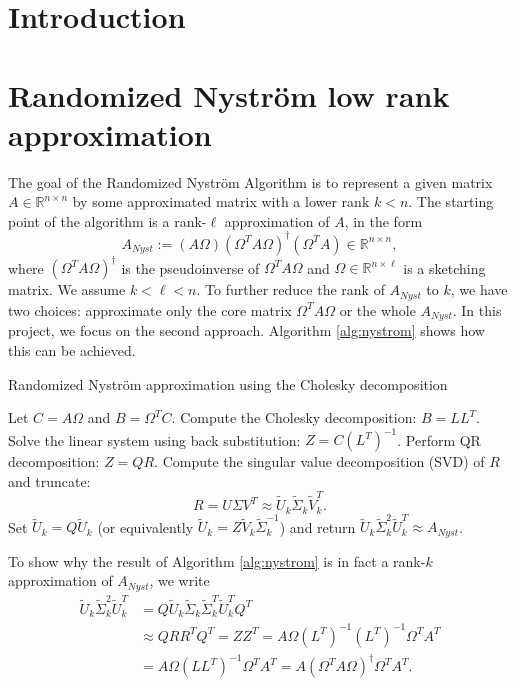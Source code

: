 \documentclass[a4paper, 12pt,oneside]{article}
\begin{document}
 
	 
	\clearpage
	\tableofcontents
	\thispagestyle{empty}
	\clearpage
	\setcounter{page}{1}

	\section{Introduction}
		\lipsum[1]
	\section{Randomized Nyström low rank approximation}
		The goal of the Randomized Nystr\"om Algorithm is to represent a given matrix $A \in \mathbb{R}^{n \times n}$ by some approximated matrix with a lower rank $k < n$. The starting point of the algorithm is a rank-$\ell$ approximation of $A$, in the form
\[
A_{Nyst} := (A\Omega)(\Omega^T A \Omega)^{\dagger}(\Omega^T A) \in \mathbb{R}^{n \times n},
\]
where $(\Omega^T A \Omega)^\dagger$ is the pseudoinverse of $\Omega^T A \Omega$ and $\Omega \in \mathbb{R}^{n \times \ell}$ is a sketching matrix. We assume $k < \ell < n$. To further reduce the rank of $A_{Nyst}$ to $k$, we have two choices: approximate only the core matrix $\Omega^T A \Omega$ or the whole $A_{Nyst}$. In this project, we focus on the second approach. Algorithm \ref{alg:nystrom} shows how this can be achieved.

\begin{algorithm}
\caption{Randomized Nystr\"om approximation using the Cholesky decomposition}
\label{alg:nystrom}
\begin{algorithmic}[1]
  \State Let $C = A\Omega$ and $B = \Omega^T C$.
  \State Compute the Cholesky decomposition: $B = LL^T$.
  \State Solve the linear system using back substitution: $Z = C(L^T)^{-1}$.
  \State Perform QR decomposition: $Z = QR$.
  \State Compute the singular value decomposition (SVD) of $R$ and truncate:
  \[ R = U \Sigma V^T \approx \tilde{U}_k \tilde{\Sigma}_k \tilde{V}_k^T. \]
  \State Set $\tilde{U}_k = Q\tilde{U}_k$ (or equivalently $\tilde{U}_k = Z\tilde{V}_k\tilde{\Sigma}_k^{-1}$) and return $\tilde{U}_k \tilde{\Sigma}_k^2 \tilde{U}_k^T \approx A_{Nyst}$.
\end{algorithmic}
\end{algorithm}

To show why the result of Algorithm \ref{alg:nystrom} is in fact a rank-$k$ approximation of $A_{Nyst}$, we write
\begin{align*}
\tilde{U}_k \tilde{\Sigma}_k^2 \tilde{U}_k^T &= Q\tilde{U}_k \tilde{\Sigma}_k \tilde{\Sigma}_k^T \tilde{U}_k^T Q^T \\
&\approx QRR^T Q^T = ZZ^T = A\Omega(L^T)^{-1}(L^T)^{-1}\Omega^T A^T \\
&= A\Omega(LL^T)^{-1}\Omega^T A^T = A(\Omega^T A \Omega)^{\dagger}\Omega^T A^T.
\end{align*}
\end{document}
